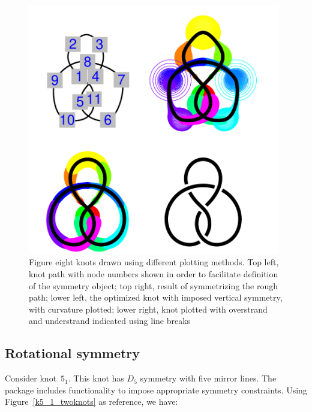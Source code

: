 \documentclass{birkjour}
\theoremstyle{definition}
\theoremstyle{remark}
\numberwithin{equation}{section}
\begin{document}
\begin{figure}[!tbp]
  \centering
\includegraphics[width=11cm]{knot-four_figure_eight_knots}
\caption{Figure eight knots drawn using different plotting methods.
  Top left, knot path with node numbers shown in order to facilitate
    \label{four_figure_8_knots} definition of the symmetry object; top
    right, result of symmetrizing the rough path; lower left, the
    optimized knot with imposed vertical symmetry, with curvature
    plotted; lower right, knot plotted with overstrand and understrand
    indicated using line breaks}
\end{figure}


\subsection{Rotational symmetry}

Consider knot~$5_1$. This knot has $D_5$ symmetry with five mirror
lines.  The package includes functionality to impose appropriate
symmetry constraints. Using Figure~\ref{k5_1_twoknots} as reference,
we have:
\end{document}
